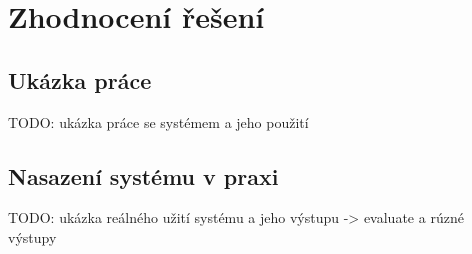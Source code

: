 \chapter{Zhodnocení řešení}

\section{Ukázka práce}

TODO: ukázka práce se systémem a jeho použití

\section{Nasazení systému v praxi}

TODO: ukázka reálného užití systému a jeho výstupu
    -> evaluate a rúzné výstupy
